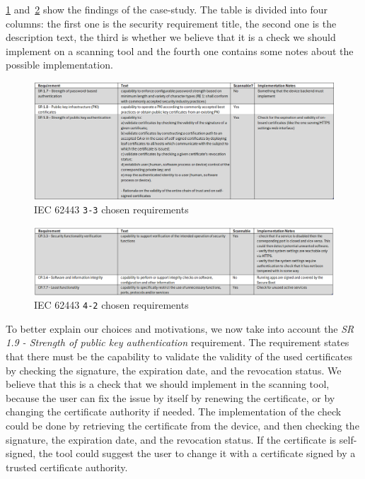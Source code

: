 \cref{fig:iec62443-findings-3_3} and~\cref{fig:iec62443-findings-4_2} show the findings of the case-study. The table is divided into four columns: the first one is the security requirement title, the second one is the description text, the third is whether we believe that it is a check we should implement on a scanning tool and the fourth one contains some notes about the possible implementation.

\begin{figure}[t]
  \centering
  \includegraphics[width=1.0\textwidth]{chapters/04/assets/iec62443-findings-3_3}
  \caption{IEC 62443 \texttt{3-3} chosen requirements}
  \label{fig:iec62443-findings-3_3}
\end{figure}

\begin{figure}[t]
  \centering
  \includegraphics[width=1.0\textwidth]{chapters/04/assets/iec62443-findings-4_2}
  \caption{IEC 62443 \texttt{4-2} chosen requirements}
  \label{fig:iec62443-findings-4_2}
\end{figure}

To better explain our choices and motivations, we now take into account the \textit{SR 1.9 - Strength of public key authentication} requirement. The requirement states that there must be the capability to validate the validity of the used certificates by checking the signature, the expiration date, and the revocation status. We believe that this is a check that we should implement in the scanning tool, because the user can fix the issue by itself by renewing the certificate, or by changing the certificate authority if needed. The implementation of the check could be done by retrieving the certificate from the device, and then checking the signature, the expiration date, and the revocation status. If the certificate is self-signed, the tool could suggest the user to change it with a certificate signed by a trusted certificate authority.

